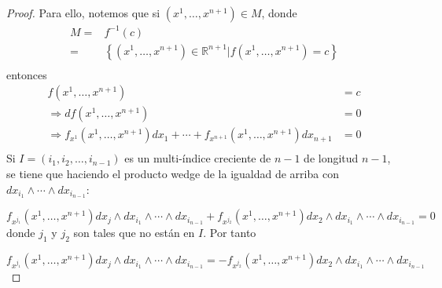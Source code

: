 \documentclass[12pt]{report}
\theoremstyle{largebreak}
\begin{document}
\begin{proof}
        Para ello, notemos que si $(x^1,\dots,x^{n+1})\in M$, donde
        \begin{equation*}
            \begin{split}
                M=&f^{-1}(c)\\
                =&\left\{(x^1,\dots,x^{n+1})\in \mathbb{R}^{n+1}|f(x^1,\dots,x^{n+1})=c\right\} \\
            \end{split}
        \end{equation*}
        entonces
        \begin{equation*}
            \begin{split}
                f(x^1,\dots,x^{n+1})&=c\\
                \Rightarrow df(x^1,\dots,x^{n+1})&=0\\
                \Rightarrow f_{x^1}(x^1,\dots,x^{n+1})dx_1+\cdots+f_{x^{n+1}}(x^1,\dots,x^{n+1})dx_{n+1}&=0\\
            \end{split}
        \end{equation*}
        Si $I=(i_1,i_2,\dots,i_{n-1})$ es un multi-índice creciente de $n-1$ de longitud $n-1$, se tiene que haciendo el producto wedge de la igualdad de arriba con $dx_{i_1}\wedge\cdots\wedge dx_{i_{n-1}}$:

        \begin{equation*}
            f_{x^{j_1}}(x^1,\dots,x^{n+1})dx_j\wedge dx_{i_1}\wedge\cdots\wedge dx_{i_{n-1}}+f_{x^{j_2}}(x^1,\dots,x^{n+1})dx_2\wedge dx_{i_1}\wedge\cdots\wedge dx_{i_{n-1}}=0
        \end{equation*}
        donde $j_1$ y $j_2$ son tales que no están en $I$. Por tanto

        \begin{equation}
            f_{x^{j_1}}(x^1,\dots,x^{n+1})dx_j\wedge dx_{i_1}\wedge\cdots\wedge dx_{i_{n-1}}=-f_{x^{j_2}}(x^1,\dots,x^{n+1})dx_2\wedge dx_{i_1}\wedge\cdots\wedge dx_{i_{n-1}}
        \end{equation}


\end{proof}
\end{document}
